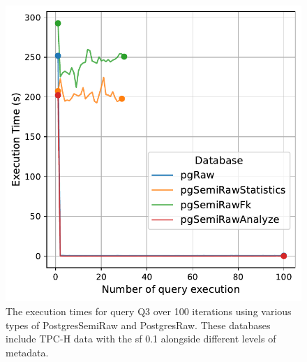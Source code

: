 \begin{figure}[hbt!]
\centering
\includegraphics[width=1.0\linewidth]{charts-eval-exp-time-stat/execution_time_db_type_Q3.pdf}
\caption[Q3:result]{The execution times for query Q3 over 100 iterations using various types of PostgresSemiRaw and PostgresRaw. These databases include TPC-H data with the \acrshort{sf} 0.1 alongside different levels of metadata.}
\label{fig:execution_time_db_type_Q3}
\end{figure}
